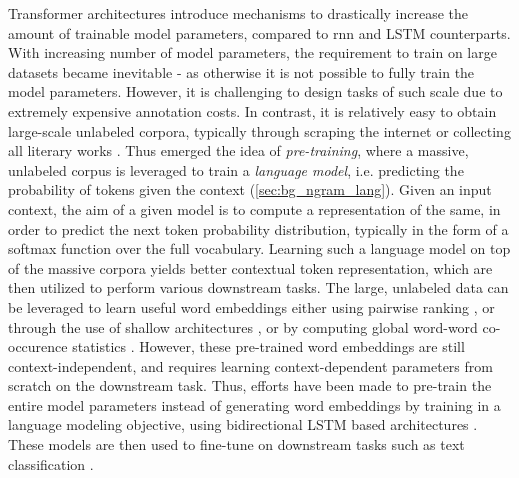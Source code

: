 \documentclass[letterpaper, 12pt]{report}
\begin{document}
Transformer architectures introduce mechanisms to drastically increase the amount of trainable model parameters, compared to \acrshort{rnn} and LSTM counterparts.
With increasing number of model parameters, the requirement to train on large datasets became inevitable - as otherwise it is not possible to fully train the model parameters. However, it is challenging to design tasks of such scale due to extremely expensive annotation costs. In contrast, it is relatively easy to obtain large-scale unlabeled corpora, typically through scraping the internet \cite{raffel2019exploring} or collecting all literary works \cite{zhu2015aligning}. Thus emerged the idea of \textit{pre-training}, where a massive, unlabeled corpus is leveraged to train a \textit{language model}, i.e. predicting the probability of tokens given the context (\autoref{sec:bg_ngram_lang}). Given an input context, the aim of a given model is to compute a representation of the same, in order to predict the next token probability distribution, typically in the form of a softmax function over the full vocabulary. Learning such a language model on top of the massive corpora yields better contextual token representation, which are then utilized to perform various downstream tasks. The large, unlabeled data can be leveraged to learn useful word embeddings either using pairwise ranking \citep{collobert2008unified}, or through the use of shallow architectures \citep{mikolov2013efficient}, or by computing global word-word co-occurence statistics \citep{pennington2014glove}. However, these pre-trained word embeddings are still context-independent, and requires learning context-dependent parameters from scratch on the downstream task. Thus, efforts have been made to pre-train the entire model parameters instead of generating word embeddings by training in a language modeling objective, using bidirectional LSTM based architectures \citep{peters2018deep}. These models are then used to fine-tune on downstream tasks such as text classification \citep{howard2018universal}.
\end{document}

